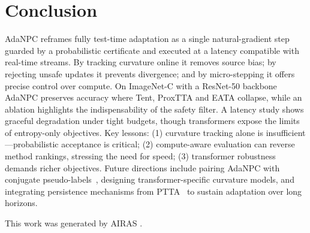 \documentclass{article} %
\begin{document}
\section{Conclusion}\label{sec:conclusion}
AdaNPC reframes fully test-time adaptation as a single natural-gradient step guarded by a probabilistic certificate and executed at a latency compatible with real-time streams. By tracking curvature online it removes source bias; by rejecting unsafe updates it prevents divergence; and by micro-stepping it offers precise control over compute. On ImageNet-C with a ResNet-50 backbone AdaNPC preserves accuracy where Tent, ProxTTA and EATA collapse, while an ablation highlights the indispensability of the safety filter. A latency study shows graceful degradation under tight budgets, though transformers expose the limits of entropy-only objectives.
Key lessons: (1) curvature tracking alone is insufficient---probabilistic acceptance is critical; (2) compute-aware evaluation can reverse method rankings, stressing the need for speed; (3) transformer robustness demands richer objectives. Future directions include pairing AdaNPC with conjugate pseudo-labels~\cite{goyal-2022-test}, designing transformer-specific curvature models, and integrating persistence mechanisms from PTTA~\cite{yuan-2023-robust,hoang-2023-persistent} to sustain adaptation over long horizons.

This work was generated by \textsc{AIRAS} \citep{airas2025}.



\end{document}

